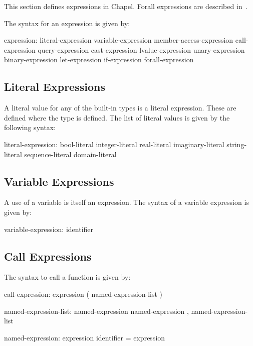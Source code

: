 \label{Expressions}

This section defines expressions in Chapel.  Forall expressions are
described in~.

The syntax for an expression is given by:
\begin{syntax}
expression:
  literal-expression
  variable-expression
  member-access-expression
  call-expression
  query-expression
  cast-expression
  lvalue-expression
  unary-expression
  binary-expression
  let-expression
  if-expression
  forall-expression
\end{syntax}

\subsection{Literal Expressions}
\label{Literal_Expressions}

A literal value for any of the built-in types is a literal expression.
These are defined where the type is defined.  The list of literal
values is given by the following syntax:
\begin{syntax}
literal-expression:
  bool-literal
  integer-literal
  real-literal
  imaginary-literal
  string-literal
  sequence-literal
  domain-literal
\end{syntax}

\subsection{Variable Expressions}
\label{Variable_Expressions}

A use of a variable is itself an expression.  The syntax of a variable
expression is given by:
\begin{syntax}
variable-expression:
  identifier
\end{syntax}

\subsection{Call Expressions}
\label{Call_Expressions}

The syntax to call a function is given by:
\begin{syntax}
call-expression:
  expression ( named-expression-list )

named-expression-list:
  named-expression
  named-expression , named-expression-list

named-expression:
  expression
  identifier = expression
\end{syntax}

